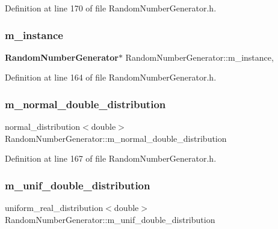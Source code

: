 Definition at line 170 of file Random\+Number\+Generator.\+h.

\mbox{\label{class_random_number_generator_a4b1f72cf7dbba86ac83bff4f9f496de3}} 
\subsubsection{m\_instance}
{\footnotesize\ttfamily \textbf{ Random\+Number\+Generator}$\ast$ Random\+Number\+Generator\+::m\+\_\+instance\hspace{0.3cm}{\ttfamily [static]}, {\ttfamily [private]}}



Definition at line 164 of file Random\+Number\+Generator.\+h.

\mbox{\label{class_random_number_generator_af52b8c4de45f210754524225e97279b1}} 
\subsubsection{m\_normal\_double\_distribution}
{\footnotesize\ttfamily normal\+\_\+distribution$<$double$>$ Random\+Number\+Generator\+::m\+\_\+normal\+\_\+double\+\_\+distribution\hspace{0.3cm}{\ttfamily [private]}}



Definition at line 167 of file Random\+Number\+Generator.\+h.

\mbox{\label{class_random_number_generator_ab7697a4a0f3efe902aa49828bd78f1e2}} 
\subsubsection{m\_unif\_double\_distribution}
{\footnotesize\ttfamily uniform\+\_\+real\+\_\+distribution$<$double$>$ Random\+Number\+Generator\+::m\+\_\+unif\+\_\+double\+\_\+distribution\hspace{0.3cm}{\ttfamily [private]}}



